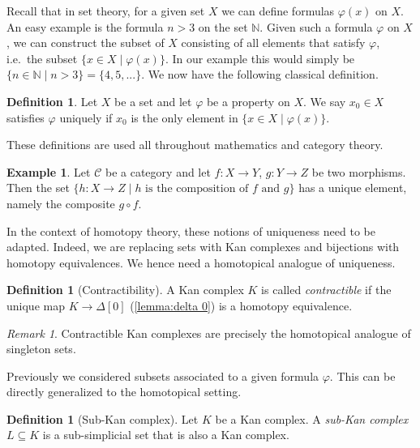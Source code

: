 \documentclass[11pt, a4paper]{amsart}
\newcommand{\cC}{\mathcal{C}}
\newcommand{\bN}{\mathbb{N}}
\theoremstyle{definition}
\newtheorem{definition}[equation]{Definition}
\newtheorem{example}[equation]{Example}
\theoremstyle{remark}
\newtheorem{remark}[equation]{Remark}
\numberwithin{equation}{section}
\begin{document}
Recall that in set theory, for a given set $X$ we can define formulas $\varphi(x)$ on $X$. An easy example is the formula $n > 3$ on the set $\bN$. Given such a formula $\varphi$ on $X$, we can construct the subset of $X$ consisting of all elements that satisfy $\varphi$, i.e.~the subset $\{x \in X \mid \varphi(x)\}$. In our example this would simply be $\{n \in \bN \mid n > 3\} = \{4,5,...\}$. We now have the following classical definition.

\begin{definition}
 Let $X$ be a set and let $\varphi$ be a property on $X$. We say $x_0 \in X$ satisfies $\varphi$ uniquely if $x_0$ is the only element in $\{x \in X \mid \varphi(x)\}$.
\end{definition}

These definitions are used all throughout mathematics and category theory. 

\begin{example}
  Let $\cC$ be a category and let $f\colon X \to Y$, $g\colon Y \to Z$ be two morphisms. Then the set $\{h \colon X \to Z \mid h \text{ is the composition of } f \text{ and } g \}$ has a unique element, namely the composite $g \circ f$.
\end{example}

In the context of homotopy theory, these notions of uniqueness need to be adapted. Indeed, we are replacing sets with Kan complexes and bijections with homotopy equivalences. We hence need a homotopical analogue of uniqueness.

\begin{definition}[Contractibility]
  A Kan complex $K$ is called \emph{contractible} if the unique map $K \to \Delta[0]$ (\cref{lemma:delta 0}) is a homotopy equivalence.
\end{definition}

\begin{remark}
  Contractible Kan complexes are precisely the homotopical analogue of singleton sets.
\end{remark}

Previously we considered subsets associated to a given formula $\varphi$. This can be directly generalized to the homotopical setting.

\begin{definition}[Sub-Kan complex]
  Let $K$ be a Kan complex. A \emph{sub-Kan complex} $L \subseteq K$ is a sub-simplicial set that is also a Kan complex.
\end{definition}
\end{document}
